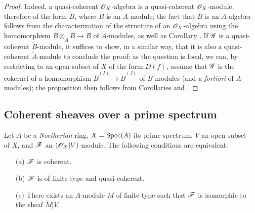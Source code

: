 \begin{proof}
\label{proof-1.1.4.3}
Indeed, a quasi-coherent $\mathscr{O}_X$-algebra is a quasi-coherent $\mathscr{O}_X$-module, therefore of the
form $\widetilde{B}$, where $B$ is an $A$-module; the fact that $B$ is an $A$-algebra
follows from the characterization of the structure of an $\mathscr{O}_X$-algebra using the
homomorphism $\widetilde{B}\otimes_{\widetilde{A}}\widetilde{B}\to\widetilde{B}$ of
$\widetilde{A}$-modules, as well as Corollary . If $\mathscr{G}$ is a quasi-coherent
$\widetilde{B}$-module, it suffices to show, in a similar way,
that it is also a quasi-coherent $\widetilde{A}$-module to conclude the proof; as the
question is local, we can, by restricting to an open subset of $X$ of the form $D(f)$, assume
that $\mathscr{G}$ is the cokernel of a homomorphism $\widetilde{B}^{(I)}\to\widetilde{B}^{(J)}$
of $\widetilde{B}$-modules (and {\em a fortiori} of $\widetilde{A}$-modules); the
proposition then follows from Corollaries  and .
\end{proof}

\subsection{Coherent sheaves over a prime spectrum}
\label{subsection-coh-over-spec}

\begin{thm}[1.5.1]
\label{1.1.5.1}
Let $A$ be a {\em Noetherian} ring, $X={\mathop{\mathrm{Spec}}\nolimits}(A)$ its prime spectrum, $V$ an open subset of
$X$, and $\mathscr{F}$ an $(\mathscr{O}_X|V)$-module. The following conditions are equivalent:
\begin{itemize}
  \item[{\rm(a)}] $\mathscr{F}$ is coherent.
  \item[{\rm(b)}] $\mathscr{F}$ is of finite type and quasi-coherent.
  \item[{\rm(c)}] There exists an $A$-module $M$ of finite type such that $\mathscr{F}$ is isomorphic to
    the sheaf $\widetilde{M}|V$.
\end{itemize}
\end{thm}

